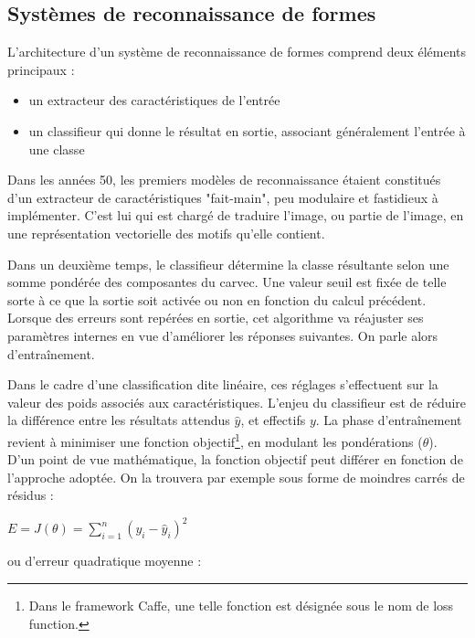     \subsection{Systèmes de reconnaissance de formes}

      L'architecture d'un système de reconnaissance de formes comprend deux éléments principaux :

      \begin{itemize}
	\item un extracteur des caractéristiques de l'entrée
	\item un classifieur qui donne le résultat en sortie, associant généralement l'entrée à une classe
      \end{itemize}

      Dans les années 50, les premiers modèles de reconnaissance étaient constitués d'un extracteur de caractéristiques "fait-main", peu modulaire et fastidieux à implémenter\cite{Bib_LeCun}.
      C'est lui qui est chargé de traduire l'image, ou partie de l'image, en une représentation vectorielle des motifs qu'elle contient.
      \par
      Dans un deuxième temps, le classifieur détermine la classe résultante selon une somme pondérée des composantes du \gls{carvec}.
      Une valeur seuil est fixée de telle sorte à ce que la sortie soit activée ou non en fonction du calcul précédent.
      Lorsque des erreurs sont repérées en sortie, cet algorithme va réajuster ses paramètres internes en vue d'améliorer les réponses suivantes. On parle alors d'entraînement.
      \par
      Dans le cadre d'une classification dite linéaire, ces réglages s'effectuent sur la valeur des poids associés aux caractéristiques.
      L'enjeu du classifieur est de réduire la différence entre les résultats attendus $\hat{y}$, et effectifs $y$.
      La phase d'entraînement revient à minimiser une fonction objectif\footnote{Dans le framework Caffe, une telle fonction est désignée sous le nom de loss function.}, en modulant les pondérations ($\theta$).
      D'un point de vue mathématique, la fonction objectif peut différer en fonction de l'approche adoptée. On la trouvera par exemple sous forme de moindres carrés de résidus\cite{Bib_WikiLS} :

      \begin{center} $ E = J({\theta}) =  \sum\limits_{i=1}^{n} (y_{i} - \hat{y}_{i} )^2 $ \end{center}

      ou d'erreur quadratique moyenne\cite{Bib_WikiMSE} :

